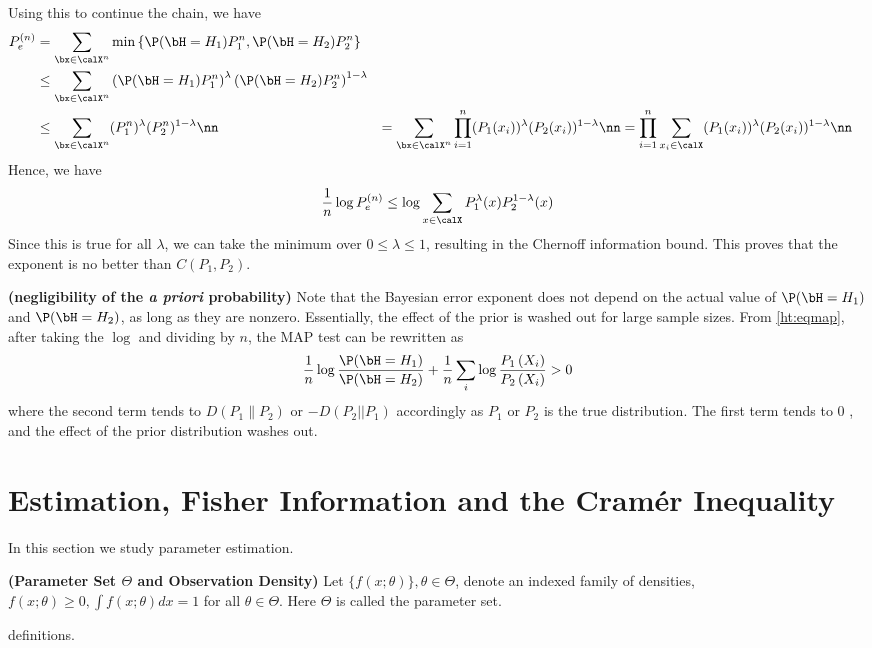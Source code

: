 \documentclass{article}
\newcommand{\bfs}[1]{\textbf{({#1})}}
\begin{document}
Using this to continue the chain, we have
\begin{align*}
\begin{aligned}
P_{e}^{(n)}  &=\sum_{\bx\in\calX^n} \min \left\{\P(\bH = H_1)  P^n_{1}, \P(\bH = H_2)  P^n_{2}\right\} \\
& \leq \sum_{\bx\in\calX^n}\left(\P(\bH = H_1)  P^n_{1}\right)^{\lambda}\left(\P(\bH = H_2)  P^n_{2}\right)^{1-\lambda} \\
& \leq \sum_{\bx\in\calX^n} (P^n_{1})^{\lambda} (P^n_{2})^{1-\lambda}\nn
& = \sum_{\bx\in\calX^n} \prod_{i=1}^{n} (P_{1}(x_i))^{\lambda}
(P_{2}(x_i))^{1-\lambda}\nn
& =  \prod_{i=1}^{n} \sum_{x_i\in\calX} (P_{1}(x_i))^{\lambda}
(P_{2}(x_i))^{1-\lambda}\nn
\end{aligned}
\end{align*}
Hence, we have
\begin{align*}
\frac{1}{n} \log P_{e}^{(n)} \leq \log \sum_{x\in\calX} P_{1}^{\lambda}(x) P_{2}^{1-\lambda}(x)
\end{align*}
Since this is true for all $\lambda$, we can take the minimum over $0 \leq \lambda \leq 1$, resulting in the Chernoff information bound. This proves that the exponent is no better than $C\left(P_{1}, P_{2}\right)$. 
\begin{rema}{\bfs{negligibility of the \emph{a priori} probability}}
Note that the Bayesian error exponent does not depend on the actual value of $\P(\bH = H_1) $ and $\P(\bH = H_2) $, as long as they are nonzero. Essentially, the effect of the prior is washed out for large sample sizes. From \cref{ht:eqmap}, after taking the $\log$ and dividing by $n$, the MAP test can be rewritten as
$$
\frac{1}{n} \log \frac{\P(\bH = H_1) }{\P(\bH = H_2) }+\frac{1}{n} \sum_{i} \log \frac{P_{1}\left(X_{i}\right)}{P_{2}\left(X_{i}\right)}>0
$$
where the second term tends to $D\left(P_{1} \| P_{2}\right)$ or $-D\left(P_{2}|| P_{1}\right)$ accordingly as $P_{1}$ or $P_{2}$ is the true distribution. The first term tends to 0 , and the effect of the prior distribution washes out.
\end{rema}

\section{Estimation, Fisher Information and the Cram\'{e}r Inequality}
In this section we study  parameter estimation. 

\begin{defa}{\bfs{Parameter Set $\Theta$ and Observation Density}}
Let $\{f(x ; \theta)\}, \theta \in \Theta$, denote an indexed family of densities, $f(x ; \theta) \geq 0, \int f(x ; \theta) d x=1$ for all $\theta \in \Theta$. Here $\Theta$ is called the parameter set.
\end{defa}definitions. 
\end{document}
